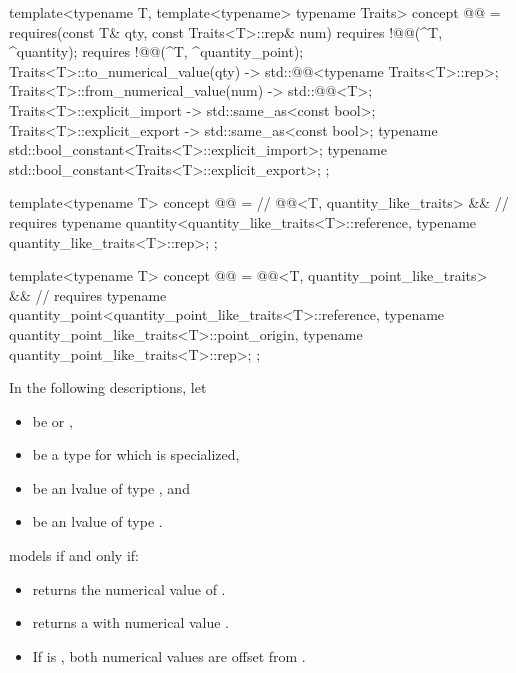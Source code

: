 \begin{itemdecl}
template<typename T, template<typename> typename Traits>
concept @@ = requires(const T& qty, const Traits<T>::rep& num) {
  requires !@@(^T, ^quantity);
  requires !@@(^T, ^quantity_point);
  { Traits<T>::to_numerical_value(qty) } -> std::@@<typename Traits<T>::rep>;
  { Traits<T>::from_numerical_value(num) } -> std::@@<T>;
  { Traits<T>::explicit_import } -> std::same_as<const bool>;
  { Traits<T>::explicit_export } -> std::same_as<const bool>;
  typename std::bool_constant<Traits<T>::explicit_import>;
  typename std::bool_constant<Traits<T>::explicit_export>;
};

template<typename T>
concept @@ =                 //
  @@<T, quantity_like_traits> &&  //
  requires {
    typename quantity<quantity_like_traits<T>::reference, typename quantity_like_traits<T>::rep>;
  };

template<typename T>
concept @@ =
  @@<T, quantity_point_like_traits> &&  //
  requires {
    typename quantity_point<quantity_point_like_traits<T>::reference,
                            typename quantity_point_like_traits<T>::point_origin,
                            typename quantity_point_like_traits<T>::rep>;
  };
\end{itemdecl}

\pnum
In the following descriptions, let
\begin{itemize}
\item
{} be  or ,
\item
{} be a type for which  is specialized,
\item
{} be an lvalue of type , and
\item
{} be an lvalue of type .
\end{itemize}

\pnum
{} models  if and only if:
\begin{itemize}
\item
{} returns the numerical value of .
\item
{} returns a  with numerical value .
\item
If  is ,
both numerical values are offset from .
\end{itemize}

